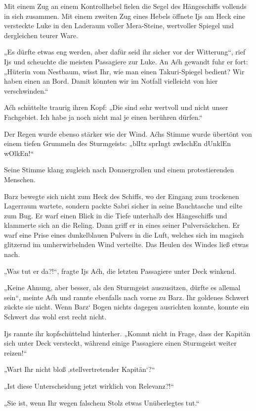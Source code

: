 Mit einem Zug an einem Kontrollhebel fielen die Segel des Hängeschiffs vollends in sich zusammen. Mit einem zweiten Zug eines Hebels öffnete Ijs am Heck eine versteckte Luke in den Laderaum voller Mera-Steine, wertvoller Spiegel und dergleichen teurer Ware.

„Es dürfte etwas eng werden, aber dafür seid ihr sicher vor der Witterung“, rief Ijs und scheuchte die meisten Passagiere zur Luke. An Aćh gewandt fuhr er fort: „Hüterin vom Nestbaum, wisst Ihr, wie man einen Takuri-Spiegel bedient? Wir haben einen an Bord. Damit könnten wir im Notfall vielleicht von hier verschwinden.“

Aćh schüttelte traurig ihren Kopf: „Die sind sehr wertvoll und nicht unser Fachgebiet. Ich habe ja noch nicht mal je einen berühren dürfen.“

Der Regen wurde ebenso stärker wie der Wind. Aćhs Stimme wurde übertönt von einem tiefen Grummeln des Sturmgeists: „blItz sprIngt zwIschEn dUnklEn wOlkEn!“

Seine Stimme klang zugleich nach Donnergrollen und einem protestierenden Menschen.

Barz bewegte sich nicht zum Heck des Schiffs, wo der Eingang zum trockenen Lagerraum wartete, sondern packte Sabri sicher in seine Bauchtasche und eilte zum Bug. Er warf einen Blick in die Tiefe unterhalb des Hängeschiffs und klammerte sich an die Reling. Dann griff er in eines seiner Pulversäckchen. Er warf eine Prise eines dunkelblauen Pulvers in die Luft, welches sich im magisch glitzernd im umherwirbelnden Wind verteilte. Das Heulen des Windes ließ etwas nach.

„Was tut er da?!“, fragte Ijs Aćh, die letzten Passagiere unter Deck winkend.

„Keine Ahnung, aber besser, als den Sturmgeist auszusitzen, dürfte es allemal sein“, meinte Aćh und rannte ebenfalls nach vorne zu Barz. Ihr goldenes Schwert zückte sie nicht. Wenn Barz‘ Bogen nichts dagegen ausrichten konnte, konnte ein Schwert das wohl erst recht nicht.

Ijs rannte ihr kopfschüttelnd hinterher. „Kommt nicht in Frage, dass der Kapitän sich unter Deck versteckt, während einige Passagiere einen Sturmgeist weiter reizen!“

„Wart Ihr nicht bloß ‚stellvertretender Kapitän‘?“

„Ist diese Unterscheidung jetzt wirklich von Relevanz?!“

„Sie ist, wenn Ihr wegen falschem Stolz etwas Unüberlegtes tut.“

